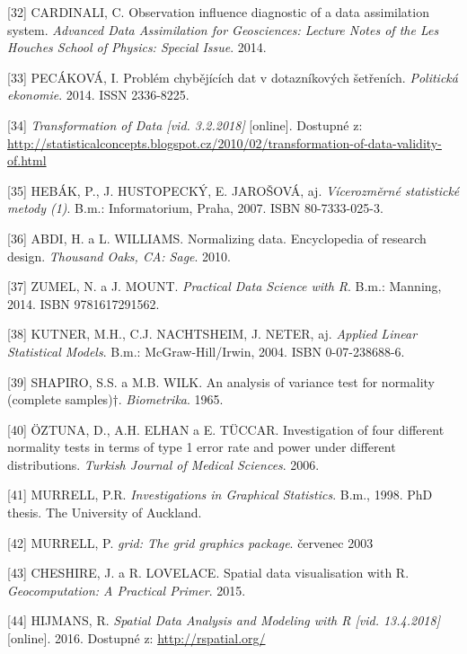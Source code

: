 \documentclass[12pt,]{article}
\begin{document}
\hypertarget{ref-leverages_regression}{}
{[}32{]} CARDINALI, C. Observation influence diagnostic of a data
assimilation system. \emph{Advanced Data Assimilation for Geosciences:
Lecture Notes of the Les Houches School of Physics: Special Issue}.
2014.

\hypertarget{ref-pecakova}{}
{[}33{]} PECÁKOVÁ, I. Problém chybějících dat v dotazníkových šetřeních.
\emph{Politická ekonomie}. 2014. ISSN 2336-8225.

\hypertarget{ref-transformation}{}
{[}34{]} \emph{Transformation of Data {[}vid. 3.2.2018{]}} {[}online{]}.
Dostupné z:
\url{http://statisticalconcepts.blogspot.cz/2010/02/transformation-of-data-validity-of.html}

\hypertarget{ref-vicerozm_stat}{}
{[}35{]} HEBÁK, P., J. HUSTOPECKÝ, E. JAROŠOVÁ, aj. \emph{Vícerozměrné
statistické metody (1)}. B.m.: Informatorium, Praha, 2007. ISBN
80-7333-025-3.

\hypertarget{ref-normalizing}{}
{[}36{]} ABDI, H. a L. WILLIAMS. Normalizing data. Encyclopedia of
research design. \emph{Thousand Oaks, CA: Sage}. 2010.

\hypertarget{ref-zumel_2014}{}
{[}37{]} ZUMEL, N. a J. MOUNT. \emph{Practical Data Science with R}.
B.m.: Manning, 2014. ISBN 9781617291562.

\hypertarget{ref-kutner_transform}{}
{[}38{]} KUTNER, M.H., C.J. NACHTSHEIM, J. NETER, aj. \emph{Applied
Linear Statistical Models}. B.m.: McGraw-Hill/Irwin, 2004. ISBN
0-07-238688-6.

\hypertarget{ref-SW_test}{}
{[}39{]} SHAPIRO, S.S. a M.B. WILK. An analysis of variance test for
normality (complete samples)†. \emph{Biometrika}. 1965.

\hypertarget{ref-normality_tests}{}
{[}40{]} ÖZTUNA, D., A.H. ELHAN a E. TÜCCAR. Investigation of four
different normality tests in terms of type 1 error rate and power under
different distributions. \emph{Turkish Journal of Medical Sciences}.
2006.

\hypertarget{ref-murrell1998}{}
{[}41{]} MURRELL, P.R. \emph{Investigations in Graphical Statistics}.
B.m., 1998. PhD thesis. The University of Auckland.

\hypertarget{ref-murrell2003}{}
{[}42{]} MURRELL, P. \emph{grid: The grid graphics package}. červenec
2003

\hypertarget{ref-spatial}{}
{[}43{]} CHESHIRE, J. a R. LOVELACE. Spatial data visualisation with R.
\emph{Geocomputation: A Practical Primer}. 2015.

\hypertarget{ref-spatial2}{}
{[}44{]} HIJMANS, R. \emph{Spatial Data Analysis and Modeling with R
{[}vid. 13.4.2018{]}} {[}online{]}. 2016. Dostupné z:
\url{http://rspatial.org/}
\end{document}
